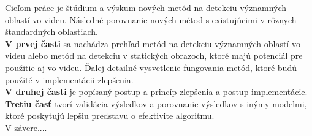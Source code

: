 Cieľom práce je štúdium a výskum nových metód na detekciu významných oblastí vo videu.
Následné porovnanie nových métod s existujúcimi v rôznych štandardných oblastiach.
\\
\textbf{V prvej časti} sa nachádza prehľad metód na detekciu významných oblastí vo videu alebo metód na detekciu v statických obrazoch, ktoré majú potenciál pre použitie aj vo videu.
Ďalej detailné vysvetlenie fungovania metód, ktoré budú použité v implementácii zlepšenia.
\\
\textbf{V druhej časti} je popísaný postup a princíp zlepšenia a postup implementácie.
\\
\textbf{Tretiu časť} tvorí validácia výsledkov a porovnanie výsledkov s inýmy modelmi, ktoré poskytujú lepšiu predstavu o efektivite algoritmu.
\\
V závere....
